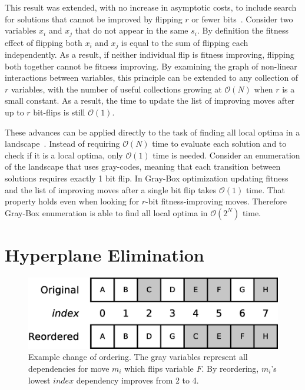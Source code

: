 \documentclass[runningheads,a4paper]{llncs}
\newcommand{\includegraphicsfit}[1]
{\texttt{[image: \#1]}}
\newcommand{\BigO}[1]{$\mathcal{O}{(#1)}$}
\begin{document}
This result was extended, with no increase in asymptotic costs,
to include search for
solutions that cannot be improved by flipping $r$ or fewer bits~\cite{chicano:2014:ball}.
Consider two variables $x_i$ and $x_j$ that do not appear in the same $s_i$.
By definition the fitness effect of flipping both $x_i$ and $x_j$ is equal to the sum
of flipping each independently. As a result, if neither individual flip is fitness improving,
flipping both together cannot be fitness improving. By examining the graph of non-linear
interactions between variables, this principle can be extended to any collection of $r$
variables, with the number of useful collections growing at \BigO{N} when $r$ is a small constant.
As a result, the time to update the list of improving moves after up to $r$ bit-flips is still \BigO{1}.

These advances can be applied directly to the task of finding all local optima in a
landscape~\cite{ochoa:2015:crossovernetworks}.
Instead of requiring \BigO{N} time to evaluate each solution and to check if it
is a local optima, only \BigO{1} time is needed. Consider an enumeration of the landscape
that uses gray-codes, meaning that each transition between solutions requires exactly 1 bit flip.
In Gray-Box optimization updating fitness and the list of improving moves after a single bit flip
takes \BigO{1} time. That property holds even when looking for $r$-bit fitness-improving moves.
Therefore Gray-Box enumeration is able to find all local optima in \BigO{2^N} time.

\section{Hyperplane Elimination}
\begin{figure}
  \centering
  \includegraphics[width=.75\columnwidth,height=\textheight,keepaspectratio]{Enumerate}
  \caption{Example change of ordering. The gray variables represent all dependencies
           for move $m_i$ which flips variable $F$. By reordering, $m_i$'s lowest $index$ dependency improves from 2 to 4.}
  \label{fig-enumerate}
\end{figure}
\end{document}
